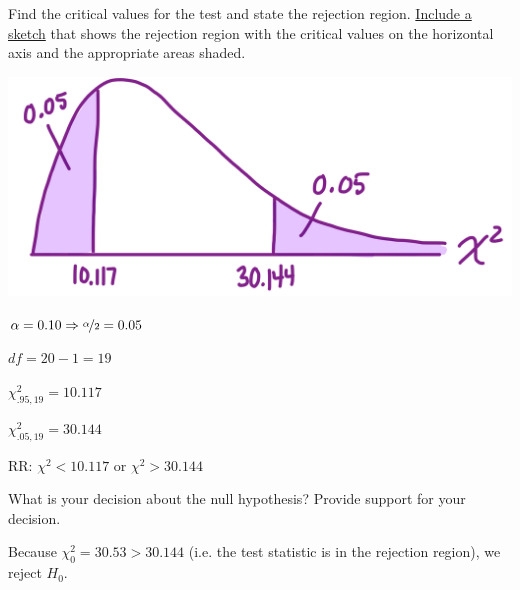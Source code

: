 \documentclass[noanswers]{exam}
\begin{document}
\begin{questions}
\begin{solution}[\stretch{1}]
	\vspace{1mm}
	
	\end{solution}
	
	\question Find the critical values for the test and state the rejection region. \underline{Include a sketch} that shows the rejection region with the critical values on the horizontal axis and the appropriate areas shaded.
	
	\vspace{-5mm}
	
	\begin{solution}[\stretch{1}]
	
	\begin{multicols}{2}
	
	\includegraphics[scale=0.09]{STAT_3090_Ch10_ChiSquare.JPEG}
    
    $\alpha=0.10 \Rightarrow \nicefrac{\alpha}{2}=0.05$
	
	$df=20-1=19$
	
	$\chi_{.95,19}^2=10.117$
	
	$\chi_{.05,19}^2=30.144$
	
	RR: $\chi^2<10.117$ or $\chi^2>30.144$
	
	
	\end{multicols}

	\end{solution}	
	
	\question What is your decision about the null hypothesis? Provide support for your decision.
	
	\begin{solution}[\stretch{1}]
	
	\vspace{1mm}
	
	Because $\chi_0^2=30.53>30.144$ (i.e. the test statistic is in the rejection region), we reject $H_0$. 
	
	\vspace{1mm}
	

\end{solution}
\end{questions}
\end{document}
